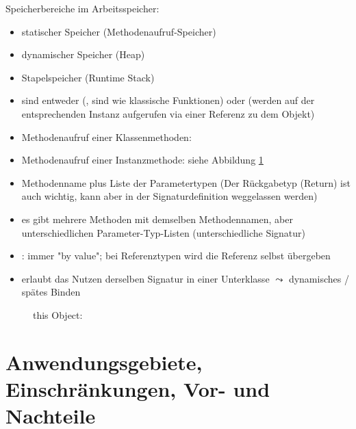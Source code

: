 Speicherbereiche im Arbeitsspeicher:
\begin{itemize}
	\item statischer Speicher (Methodenaufruf-Speicher)
	\item dynamischer Speicher (Heap)
	\item Stapelspeicher (Runtime Stack)
\end{itemize}

\begin{itemize}
	\item sind entweder  (, sind wie klassische Funktionen) oder  (werden auf der entsprechenden Instanz aufgerufen via einer Referenz zu dem Objekt)
	\item Methodenaufruf einer Klassenmethoden:\\ 
	\item Methodenaufruf einer Instanzmethode: siehe Abbildung \ref{Abb:thisObj}\\ 
	\item {} Methodenname plus Liste der Parametertypen
	(Der Rückgabetyp (Return) ist auch wichtig, kann aber  in der Signaturdefinition weggelassen werden)
	\item {} 
		es gibt mehrere Methoden mit demselben Methodennamen, aber unterschiedlichen Parameter-Typ-Listen (unterschiedliche Signatur)
	\item {}: immer "by value";
	bei Referenztypen wird die Referenz selbst übergeben
	\item {}
	erlaubt das Nutzen derselben Signatur in einer Unterklasse
	$\leadsto$ dynamisches / spätes Binden
\end{itemize}

\begin{figure}[H] %
	\begin{center}
		
		\caption{this Object: }
		\label{Abb:thisObj}
	\end{center}
\end{figure}

\section{Anwendungsgebiete, Einschränkungen, Vor- und Nachteile}



